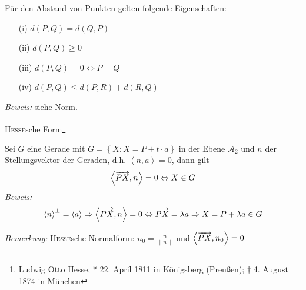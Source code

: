 \begin{mysatz}
    Für den Abstand von Punkten gelten folgende Eigenschaften:
    \begin{itemize}
        \item[(i)] $d(P,Q) = d(Q,P)$
        \item[(ii)] $d(P,Q) \geq 0$
        \item[(iii)] $d(P,Q) = 0 \Leftrightarrow P = Q$
        \item[(iv)] $d(P,Q) \leq d(P,R) + d(R,Q)$
    \end{itemize}
    \textit{Beweis:} siehe Norm.
\end{mysatz}

\begin{mylemma}
    \textsc{Hesse}sche Form\footnote{Ludwig Otto Hesse, * 22. April 1811 in Königsberg (Preußen); $\dagger$ 4. August 1874 in München}

    Sei $G$ eine Gerade mit $G = \left\{ X : X = P+t \cdot a \right\}$ in der Ebene $\mathcal{A}_2$ und $n$ der Stellungsvektor der Geraden, d.h. $\left\langle n,a \right\rangle=0$, dann gilt
    \begin{align*}
        \left\langle \overrightarrow{PX} , n \right\rangle = 0 \Leftrightarrow X \in G
    \end{align*}
    \textit{Beweis:}
    \begin{align*}
        \left\langle n \right\rangle^{\bot} = \left\langle a \right\rangle \Rightarrow \left\langle \overrightarrow{PX} , n \right\rangle = 0 \Leftrightarrow \overrightarrow{PX} = \lambda a \Rightarrow X = P + \lambda a \in G
    \end{align*}
\end{mylemma}
\textit{Bemerkung:} \textsc{Hesse}sche Normalform: $n_0 = \frac{n}{\| n \|}$ und $\left\langle \overrightarrow{PX} , n_0 \right\rangle = 0$

